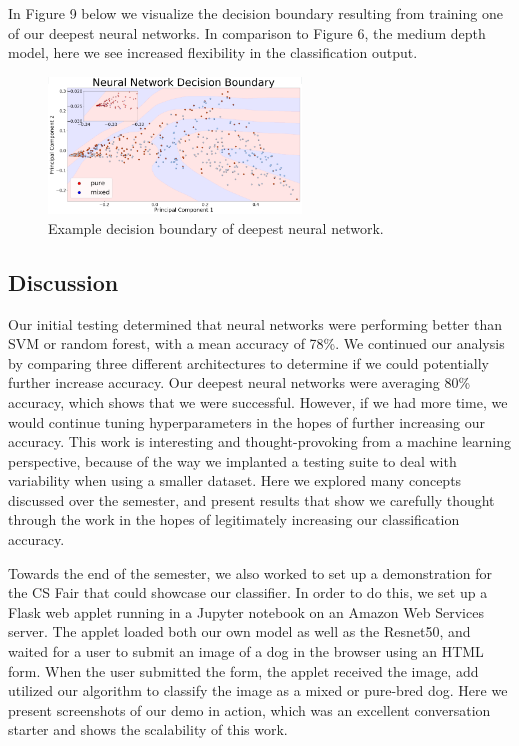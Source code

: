 \documentclass[12pt]{article}
\begin{document}
In Figure 9 below we visualize the decision boundary resulting from training one of our deepest neural networks. In comparison to Figure 6, the medium depth model, here we see increased flexibility in the classification output.

\begin{figure}[H]
\centering
\includegraphics[width=0.6\textwidth]{updatedboundary}
\caption{Example decision boundary of deepest neural network.}
\end{figure}


\subsection{Discussion}

Our initial testing determined that neural networks were performing better than SVM or random forest, with a mean accuracy of 78\%. We continued our analysis by comparing three different architectures to determine if we could potentially further increase accuracy. Our deepest neural networks were averaging 80\% accuracy, which shows that we were successful. However, if we had more time, we would continue tuning hyperparameters in the hopes of further increasing our accuracy. This work is interesting and thought-provoking from a machine learning perspective, because of the way we implanted a testing suite to deal with variability when using a smaller dataset. Here we explored many concepts discussed over the semester, and present results that show we carefully thought through the work in the hopes of legitimately increasing our classification accuracy. 

Towards the end of the semester, we also worked to set up a demonstration for the CS Fair that could showcase our classifier. In order to do this, we set up a Flask web applet running in a Jupyter notebook on an Amazon Web Services server. The applet loaded both our own model as well as the Resnet50, and waited for a user to submit an image of a dog in the browser using an HTML form. When the user submitted the form, the applet received the image, add utilized our algorithm to classify the image as a mixed or pure-bred dog. Here we present screenshots of our demo in action, which was an excellent conversation starter and shows the scalability of this work. 
\end{document}
